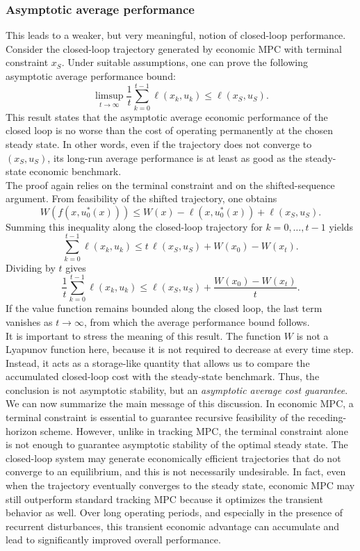 \subsubsection{Asymptotic average performance}
This leads to a weaker, but very meaningful, notion of closed-loop performance. Consider the closed-loop trajectory generated by economic MPC with terminal constraint $x_S$. Under suitable assumptions, one can prove the following asymptotic average performance bound:
\[
\limsup_{t\to\infty}\frac{1}{t}\sum_{k=0}^{t-1}\ell(x_k,u_k)\leq \ell(x_S,u_S).
\]
This result states that the asymptotic average economic performance of the closed loop is no worse than the cost of operating permanently at the chosen steady state. In other words, even if the trajectory does not converge to $(x_S,u_S)$, its long-run average performance is at least as good as the steady-state economic benchmark.\\
The proof again relies on the terminal constraint and on the shifted-sequence argument. From feasibility of the shifted trajectory, one obtains
\[
W(f(x,u_0^*(x))) \leq W(x)-\ell(x,u_0^*(x))+\ell(x_S,u_S).
\]
Summing this inequality along the closed-loop trajectory for $k=0,\dots,t-1$ yields
\[
\sum_{k=0}^{t-1}\ell(x_k,u_k)
\leq
t\,\ell(x_S,u_S) + W(x_0)-W(x_t).
\]
Dividing by $t$ gives
\[
\frac{1}{t}\sum_{k=0}^{t-1}\ell(x_k,u_k)
\leq
\ell(x_S,u_S) + \frac{W(x_0)-W(x_t)}{t}.
\]
If the value function remains bounded along the closed loop, the last term vanishes as $t\to\infty$, from which the average performance bound follows.\\

It is important to stress the meaning of this result. The function $W$ is not a Lyapunov function here, because it is not required to decrease at every time step. Instead, it acts as a storage-like quantity that allows us to compare the accumulated closed-loop cost with the steady-state benchmark. Thus, the conclusion is not asymptotic stability, but an \emph{asymptotic average cost guarantee}.\\

We can now summarize the main message of this discussion. In economic MPC, a terminal constraint is essential to guarantee recursive feasibility of the receding-horizon scheme. However, unlike in tracking MPC, the terminal constraint alone is not enough to guarantee asymptotic stability of the optimal steady state. The closed-loop system may generate economically efficient trajectories that do not converge to an equilibrium, and this is not necessarily undesirable. In fact, even when the trajectory eventually converges to the steady state, economic MPC may still outperform standard tracking MPC because it optimizes the transient behavior as well. Over long operating periods, and especially in the presence of recurrent disturbances, this transient economic advantage can accumulate and lead to significantly improved overall performance.\\

